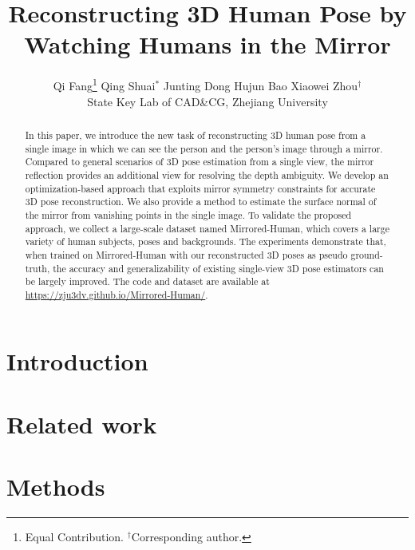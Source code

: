 \documentclass[final]{cvpr}
\begin{document}
\title{Reconstructing 3D Human Pose by Watching Humans in the Mirror}

\author{Qi Fang\thanks{Equal Contribution. $^\dag$Corresponding author.}
\quad Qing Shuai$^{*}$
\quad Junting Dong
\quad Hujun Bao
\quad Xiaowei Zhou$^{\dag}$
\\[1.5mm]
State Key Lab of CAD\&CG, Zhejiang University 
}


\maketitle
\pagestyle{empty}
\thispagestyle{empty}

\begin{abstract}
In this paper, we introduce the new task of reconstructing 3D human pose from a single image in which we can see the person and the person's image through a mirror. Compared to general scenarios of 3D pose estimation from a single view, the mirror reflection provides an additional view for resolving the depth ambiguity.
We develop an optimization-based approach that exploits mirror symmetry constraints for accurate 3D pose reconstruction. We also provide a method to estimate the surface normal of the mirror from vanishing points in the single image. 
To validate the proposed approach, we collect a large-scale dataset named Mirrored-Human, which covers a large variety of human subjects, poses and backgrounds. The experiments demonstrate that, when trained on Mirrored-Human with our reconstructed 3D poses as pseudo ground-truth, the accuracy and generalizability of existing single-view 3D pose estimators can be largely improved. The code and dataset are available at \url{https://zju3dv.github.io/Mirrored-Human/}.

\end{abstract}

\section{Introduction}


\section{Related work}


\section{Methods}








\newpage
{\small


}
\end{document}

